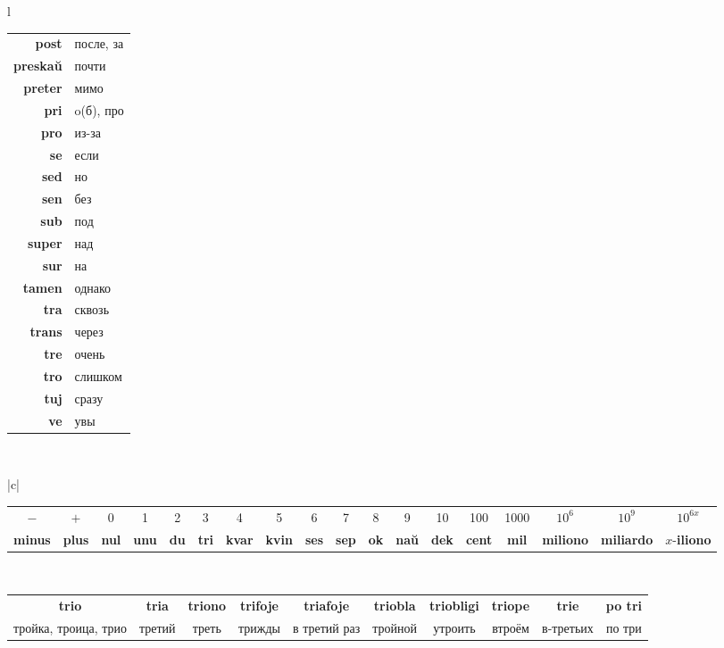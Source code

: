 \documentclass{article}
\def\b#1{\textbf{#1}}
\begin{document}
\begin{center}
\begin{tabular}{l}
\hspace{-2em}
\begin{tabular}{>{\bfseries}rl}
post & после, за \\
preskaŭ & почти \\
preter & мимо \\
pri & o(б), про \\
pro & из-за \\
se & если \\
sed & но \\
sen & без \\
sub & под \\
super & над \\
sur & на \\
tamen & однако \\
tra & сквозь \\
trans & через \\
tre & очень \\
tro & слишком \\
tuj & сразу \\
ve & увы \\
\end{tabular}
\vspace{0.5em}\\

\begin{tabular}{|c|}
\hline
\begin{tabular}{c|c|c|c|c|c|c|c|c|c|c|c|c|c|c|c|c|c}
$-$ & $+$ & 0 & 1 & 2 & 3 & 4 & 5 & 6 & 7 & 8 & 9 & 10 & 100 & 1000 & $10^6$ & $10^9$ & $10^{6x}$ \\
\b{minus} & \b{plus} & \b{nul} & \b{unu} & \b{du} & \b{tri} & \b{kvar} & \b{kvin} & \b{ses} & \b{sep} & \b{ok} & \b{naŭ} & \b{dek} & \b{cent} & \b{mil} & \b{miliono} & \b{miliardo} & $x$-\b{iliono} \\
\end{tabular}\\
\hline
\begin{tabular}{c|c|c|c|c|c|c|c|c|c}
\b{trio} & \b{tria} & \b{triono} & \b{trifoje} & \b{triafoje} & \b{triobla} & \b{triobligi} & \b{triope} & \b{trie} & \b{po tri} \\
тройка, троица, трио & третий & треть & трижды & в третий раз & тройной & утроить & втроём  & в-третьих & по три \\
\end{tabular}\\
\hline
\end{tabular}
\vspace{0.5em}\\


\end{tabular}
\end{center}
\end{document}
